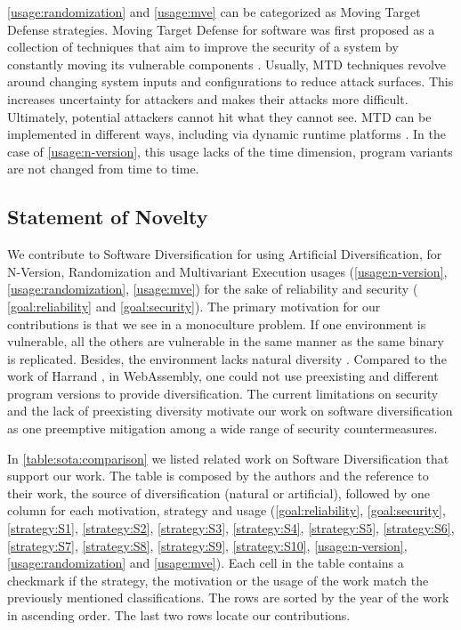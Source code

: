 \autoref{usage:randomization} and \autoref{usage:mve} can be categorized as Moving Target Defense strategies. Moving Target Defense for software was first proposed as a collection of techniques that aim to improve the security of a system by constantly moving its vulnerable components \cite{MTDNationalCyberLaep, okhravi2013survey}. Usually, MTD techniques revolve around changing system inputs and configurations to reduce attack surfaces. 
This increases uncertainty for attackers and makes their attacks more difficult. Ultimately, potential attackers cannot hit what they cannot see. 
MTD can be implemented in different ways, including via dynamic runtime platforms \cite{10.1145/3318216.3363338}. 
In the case of \autoref{usage:n-version}, this usage lacks of the time dimension, \ie program variants are not changed from time to time. 





\subsection*{Statement of Novelty}


We contribute to Software Diversification for \wasm using Artificial Diversification, for N-Version, Randomization and Multivariant Execution usages (\autoref{usage:n-version}, \autoref{usage:randomization}, \autoref{usage:mve}) for the sake of reliability and security ( \autoref{goal:reliability} and \autoref{goal:security}). 
The primary motivation for our contributions is that we see in \wasm a monoculture problem. If one environment is vulnerable, all the others are vulnerable in the same manner as the same \wasm binary is replicated. 
Besides, the \wasm environment lacks natural diversity \cite{natural_diversity}. Compared to the work of Harrand \etal \citationneeded, in WebAssembly, one could not use preexisting and different program versions to provide diversification. The current limitations on security and the lack of preexisting diversity motivate our work on software diversification as one preemptive mitigation among a wide range of security countermeasures. 


In \autoref{table:sota:comparison} we listed related work on Software Diversification that support our work. The table is composed by the authors and the reference to their work, the source of diversification (natural or artificial), followed by one column for each motivation, strategy and usage (\autoref{goal:reliability},  \autoref{goal:security},  \autoref{strategy:S1},  \autoref{strategy:S2},  \autoref{strategy:S3},  \autoref{strategy:S4},  \autoref{strategy:S5},  \autoref{strategy:S6},  \autoref{strategy:S7},  \autoref{strategy:S8},  \autoref{strategy:S9}, \autoref{strategy:S10}, \autoref{usage:n-version}, \autoref{usage:randomization} and \autoref{usage:mve}). Each cell in the table contains a checkmark if the strategy, the motivation or the usage of the work match the previously mentioned classifications. The rows are sorted by the year of the work in ascending order. The last two rows locate our contributions. 

